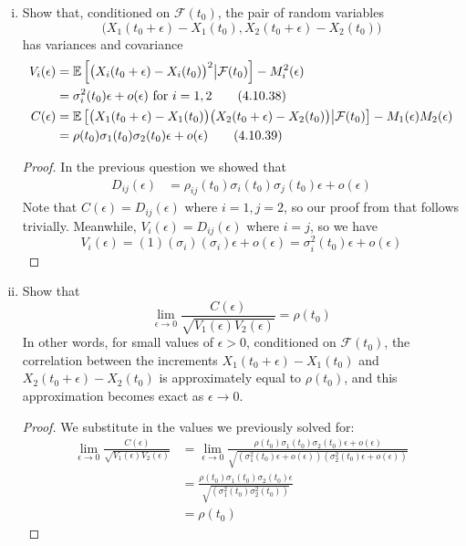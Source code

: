\documentclass{article}
\newcommand{\E}{\mathbb{E}}
\newcommand{\F}{\mathcal{F}}
\newcommand{\eps}{\epsilon}
\newcommand{\limit}[1]{\underset{#1}{\lim}}
\theoremstyle{definition}
\theoremstyle{definition}
\begin{document}
\begin{enumerate}
\begin{enumerate}[(i)]
\begin{proof}
    
    \end{proof}
    
    \item Show that, conditioned on $\F(t_0)$, the pair of random variables
    $$ \big(X_1(t_0+\eps)-X_1(t_0),X_2(t_0+\eps)-X_2(t_0)\big)$$
    has variances and covariance
    \begin{align}
        V_i(\eps) &= \E\left[ \big(X_i(t_0+\eps)-X_i(t_0) \big)^2 \big| \F(t_0) \right]-M_i^2(\eps) \notag \\
            &= \sigma_i^2(t_0) \eps + o(\eps) \text{ for } i=1,2 \tag{4.10.38} \\
        C(\eps) &= \E\left[ \big(X_1(t_0+\eps)-X_1(t_0) \big)\big(X_2(t_0+\eps)-X_2(t_0) \big)\big| \F(t_0) \right]-M_1(\eps)M_2(\eps) \notag \\
            &= \rho(t_0)\sigma_1(t_0)\sigma_2(t_0)\eps + o(\eps) \tag{4.10.39}
    \end{align}
    
    \begin{proof}
    In the previous question we showed that
    \begin{align*}
        D_{ij}(\eps) &= \rho_{ij}(t_0)\sigma_i(t_0)\sigma_j(t_0)\eps + o(\eps)
    \end{align*}
    Note that $C(\eps) = D_{ij}(\eps)$ where $i=1,j=2$, so our proof from that follows trivially. Meanwhile, $V_i(\eps)=D_{ij}(\eps)$ where $i=j$, so we have
    $$ V_i(\eps) = (1)(\sigma_i)(\sigma_i)\eps+o(\eps) = \sigma_i^2(t_0)\eps +o(\eps)$$\end{proof}
    
    \item Show that 
    \begin{equation}
        \limit{\eps \to 0} \frac{C(\eps)}{\sqrt{V_1(\eps)V_2(\eps)}}=\rho(t_0) \tag{4.10.40}
    \end{equation}
    In other words, for small values of $\eps>0$, conditioned on $\F(t_0)$, the correlation between the increments $X_1(t_0+\eps)-X_1(t_0)$ and $X_2(t_0+\eps)-X_2(t_0)$ is approximately equal to $\rho(t_0)$, and this approximation becomes exact as $\eps \to 0$. 

    
    \begin{proof}
We substitute in the values we previously solved for:    
\begin{align*}
    \limit{\eps \to 0} \frac{C(\eps)}{\sqrt{V_1(\eps)V_2(\eps)}} &= \limit{\eps \to 0} \frac{\rho(t_0)\sigma_1(t_0)\sigma_2(t_0)\eps + o(\eps)}{\sqrt{(\sigma_1^2(t_0)\eps +o(\eps))(\sigma_2^2(t_0)\eps +o(\eps))}} \\
    &= \frac{\rho(t_0)\sigma_1(t_0)\sigma_2(t_0)\eps}{\sqrt{(\sigma_1^2(t_0)\sigma_2^2(t_0))}}\\
    &= \rho(t_0)
\end{align*}
    \end{proof}
    \end{enumerate}
    

\end{enumerate}
\end{document}
